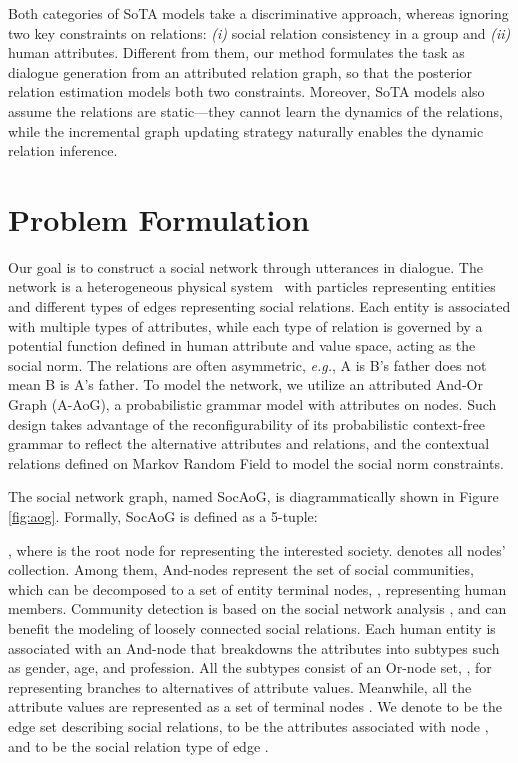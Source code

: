 \documentclass[11pt,a4paper]{article}
\begin{document}
Both categories of SoTA models take a discriminative approach, whereas ignoring two key constraints on relations: \textit{(i)} social relation consistency in a group and \textit{(ii)} human attributes. 
Different from them, our method formulates the task as dialogue generation from an attributed relation graph, so that the posterior relation estimation models both two constraints. 
Moreover, SoTA models also assume the relations are static---they cannot learn the dynamics of the relations, while the incremental graph updating strategy naturally enables the dynamic relation inference. 


\section{Problem Formulation}
Our goal is to construct a social network through utterances in dialogue. The network is a heterogeneous physical system~\citep{yongqiang1997theory} with particles representing entities and different types of edges representing social relations. Each entity is associated with multiple types of attributes, while each type of relation is governed by a potential function defined in human attribute and value space, acting as the social norm. The relations are often asymmetric, \textit{e.g.}, A is B's father does not mean B is A's father. To model the network, we utilize an attributed And-Or Graph (A-AoG), a probabilistic grammar model with attributes on nodes. Such design takes advantage of the reconfigurability of its probabilistic context-free grammar to reflect the alternative attributes and relations, and the contextual relations defined on Markov Random Field to model the social norm constraints.

The social network graph, named SocAoG, is diagrammatically shown in Figure \ref{fig:aog}. Formally, SocAoG is defined as a 5-tuple:

, where  is the root node for representing the interested society.  denotes all nodes' collection. Among them, And-nodes  represent the set of social communities, which can be decomposed to a set of entity terminal nodes, , representing human members. Community detection is based on the social network analysis \cite{bedi2016community, du2007community}, and can benefit the modeling of loosely connected social relations. Each human entity is associated with an And-node that breakdowns the attributes into subtypes such as gender, age, and profession.
All the subtypes consist of an Or-node set, , for representing branches to alternatives of attribute values. Meanwhile, all the attribute values are represented as a set of terminal nodes . 
We denote  to be the edge set describing social relations,  to be the attributes associated with node , and  to be the social relation type of edge . 
\end{document}
